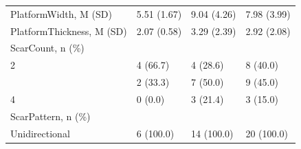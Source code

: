 \documentclass[12pt,twoside]{reedthesis}
\begin{document}
\begin{longtable}[t]{llll}
PlatformWidth, M (SD) & 5.51 (1.67) & 9.04 (4.26) & 7.98 (3.99)\\
PlatformThickness, M (SD) & 2.07 (0.58) & 3.29 (2.39) & 2.92 (2.08)\\
ScarCount, n (\%) &  &  & \\
2 & 4 (66.7) & 4 (28.6) & 8 (40.0)\\
\addlinespace
3 & 2 (33.3) & 7 (50.0) & 9 (45.0)\\
4 & 0 (0.0) & 3 (21.4) & 3 (15.0)\\
ScarPattern, n (\%) &  &  & \\
Unidirectional & 6 (100.0) & 14 (100.0) & 20 (100.0)\\
\bottomrule
\end{longtable}
\begin{table}

\caption{\label{tab:unnamed-chunk-80}Terminal Gravettinan Elongated product measurements (width, length and thickness) with mean and standard deviation values.}
\centering
{}
\end{table}
\begin{table}

\caption{\label{tab:unnamed-chunk-81}Proto-Solutrean Elongated product measurements (width, length and thickness) with mean and standard deviation values.}
\centering
{}
\end{table}
\backmatter
\end{document}
